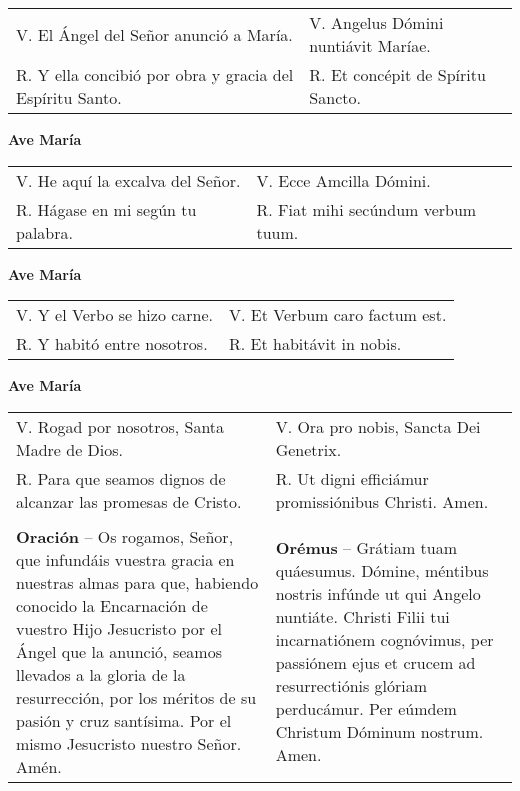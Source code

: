 \documentclass[11pt,a4paper]{book}
\begin{document}
    \begin{tabular} { p{} p{} }
        V. El Ángel del Señor anunció a María. & V. Angelus Dómini nuntiávit Maríae.\\
        R. Y ella concibió por obra y gracia del Espíritu Santo. & R. Et concépit de Spíritu Sancto.
    \end{tabular}

    \begin{center}
        \textbf{Ave María}
    \end{center}

    \begin{tabular} { p{} p{} }
        V. He aquí la excalva del Señor. & V. Ecce Amcilla Dómini.\\
        R. Hágase en mi según tu palabra. & R. Fiat mihi secúndum verbum tuum.
    \end{tabular}

    \begin{center}
        \textbf{Ave María}
    \end{center}

    \begin{tabular} { p{} p{} }
        V. Y el Verbo se hizo carne. & V. Et Verbum caro factum est.\\
        R. Y habitó entre nosotros. & R. Et habitávit in nobis.
    \end{tabular}

    \begin{center}
        \textbf{Ave María}
    \end{center}

    \begin{tabular} { p{} p{} }
        V. Rogad por nosotros, Santa Madre de Dios. & V. Ora pro nobis, Sancta Dei Genetrix.\\
        R. Para que seamos dignos de alcanzar las promesas de Cristo. & R. Ut digni efficiámur promissiónibus Christi. Amen.\\\\
        \textbf{Oración} -- Os rogamos, Señor, que infundáis vuestra gracia en nuestras almas para que, 
        habiendo conocido la Encarnación de vuestro Hijo Jesucristo por el Ángel que la anunció, 
        seamos llevados a la gloria de la resurrección, por los méritos de su pasión y cruz santísima. 
        Por el mismo Jesucristo nuestro Señor. Amén. & 
        \textbf{Orémus} -- Grátiam tuam quáesumus. Dómine, méntibus nostris infúnde ut qui Angelo nuntiáte. 
        Christi Filii tui incarnatiónem cognóvimus, per passiónem ejus et crucem ad resurrectiónis glóriam perducámur. 
        Per eúmdem Christum Dóminum nostrum. Amen.
    \end{tabular}
\end{document}
